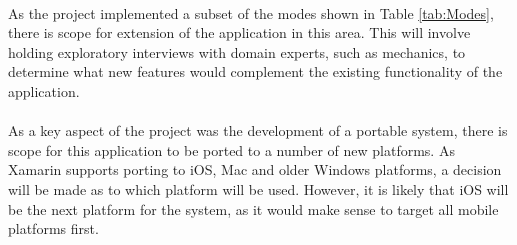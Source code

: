 	\paragraph{}{
	As the project implemented a subset of the modes shown in Table \ref{tab:Modes}, there is scope for extension of the application in this area. This will involve holding exploratory interviews with domain experts, such as mechanics, to determine what new features would complement the existing	functionality of the application.
	}
	
	\paragraph{}{
	As a key aspect of the project was the development of a portable system, there is scope for this application to be ported to a number of new platforms. As Xamarin supports porting to iOS, Mac and older Windows platforms, a decision will be made as to which platform will be used. However, it is likely that iOS will be the next platform for the system, as it would make sense to target all mobile platforms first.
	}